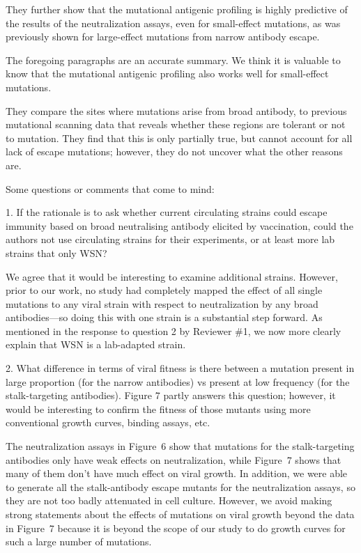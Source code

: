 \documentclass[11pt, oneside]{article}   	%
\begin{document}
They further show that the mutational antigenic profiling is highly predictive of the
results of the neutralization assays, even for small-effect mutations, as was previously shown for large-effect mutations from narrow antibody escape.

{\color{black}
The foregoing paragraphs are an accurate summary.
We think it is valuable to know that the mutational antigenic profiling also works well for small-effect mutations.
}

They compare the sites where mutations arise from broad antibody, to previous mutational scanning data that reveals whether these regions are tolerant or not to mutation. They find that this is only partially true, but cannot account for all lack of escape mutations; however, they do not uncover what the other reasons are.

Some questions or comments that come to mind:

1. If the rationale is to ask whether current circulating strains could escape immunity based on broad neutralising antibody elicited by vaccination, could the authors not use circulating strains for their experiments, or at least more lab strains that only WSN?

{\color{black}
We agree that it would be interesting to examine additional strains.
However, prior to our work, no study had completely mapped the effect of all single mutations to any viral strain with respect to neutralization by any broad antibodies---so doing this with one strain is a substantial step forward.
As mentioned in the response to question 2 by Reviewer \#1, we now more clearly explain that WSN is a lab-adapted strain.
}

2. What difference in terms of viral fitness is there between a mutation present in large proportion (for the narrow antibodies) vs present at low frequency (for the stalk-targeting antibodies). Figure 7 partly answers this question; however, it would be interesting to confirm the fitness of those mutants using more conventional growth curves, binding assays, etc.

{\color{black}
The neutralization assays in Figure~6 show that mutations for the stalk-targeting antibodies only have weak effects on neutralization, while Figure~7 shows that many of them don't have much effect on viral growth.
In addition, we were able to generate all the stalk-antibody escape mutants for the neutralization assays, so they are not too badly attenuated in cell culture.
However, we avoid making strong statements about the effects of mutations on viral growth beyond the data in Figure~7 because it is beyond the scope of our study to do growth curves for such a large number of mutations.}
\end{document}
